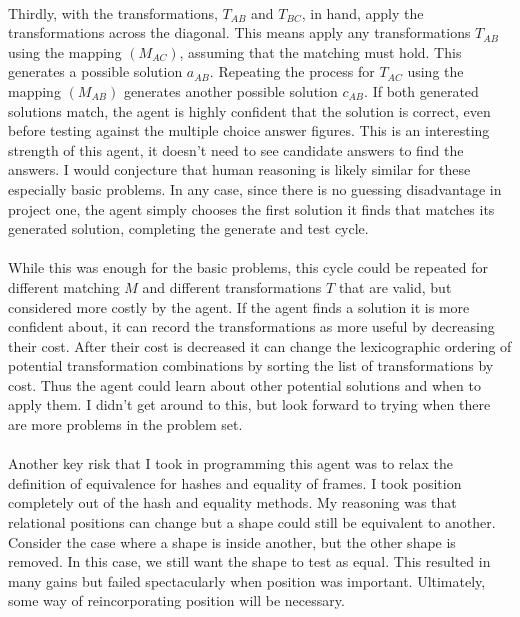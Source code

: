 \documentclass[12pt]{article}
\begin{document}
\paragraph{}
Thirdly, with the transformations, $T_{AB}$ and $T_{BC}$, in hand, apply the transformations across the diagonal. This means apply any transformations $T_{AB}$ using the mapping $(M_{AC})$, assuming that the matching must hold. This generates a possible solution $a_{AB}$. Repeating the process for $T_{AC}$ using the mapping $(M_{AB})$ generates another possible solution $c_{AB}$. If both generated solutions match, the agent is highly confident that the solution is correct, even before testing against the multiple choice answer figures. This is an interesting strength of this agent, it doesn't need to see candidate answers to find the answers. I would conjecture that human reasoning is likely similar for these especially basic problems. In any case, since there is no guessing disadvantage in project one, the agent simply chooses the first solution it finds that matches its generated solution, completing the generate and test cycle. 
\paragraph{}
While this was enough for the basic problems, this cycle could be repeated for different matching $M$ and different transformations $T$ that are valid, but considered more costly by the agent. If the agent finds a solution it is more confident about, it can record the transformations as more useful by decreasing their cost. After their cost is decreased it can change the lexicographic ordering of potential transformation combinations by sorting the list of transformations by cost. Thus the agent could learn about other potential solutions and when to apply them. I didn't get around to this, but look forward to trying when there are more problems in the problem set.
\paragraph{}
Another key risk that I took in programming this agent was to relax the definition of equivalence for hashes and equality of frames. I took position completely out of the hash and equality methods. My reasoning was that relational positions can change but a shape could still be equivalent to another. Consider the case where a shape is inside another, but the other shape is removed. In this case, we still want the shape to test as equal. This resulted in many gains but failed spectacularly when position was important. Ultimately, some way of reincorporating position will be necessary. 
\end{document}
